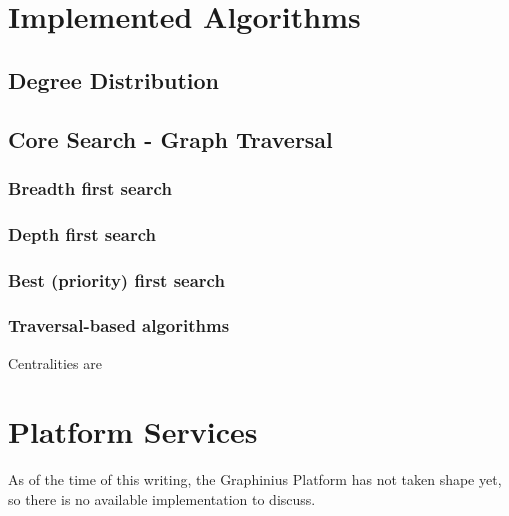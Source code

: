 \section{Implemented Algorithms}
\label{sect:implemented_algos}

	\subsection{Degree Distribution}
	\label{ssect:deg_dist}

	\subsection{Core Search - Graph Traversal}
	\label{ssect:core_search}
	
		\subsubsection{Breadth first search}
		\label{sssect:search_bfs}
		
		\subsubsection{Depth first search}
		\label{sssect:search_dfs}
		
		\subsubsection{Best (priority) first search}
		\label{sssect:search_pfs}
		
		\subsubsection{Traversal-based algorithms}
		\label{sssect:travseral_algos}
		
		Centralities are 
	
	
\section{Platform Services}
\label{sect:platform_services}

As of the time of this writing, the Graphinius Platform has not taken shape yet, so there is no available implementation to discuss.



